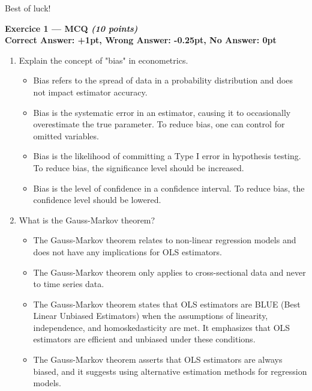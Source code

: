 \documentclass{article}
\begin{document}
\vspace{1cm}

Best of luck!

\newpage

\textbf{Exercice 1 --- MCQ \textit{(10 points)}}\\[1em]
\textbf{Correct Answer: +1pt, Wrong Answer: -0.25pt, No Answer: 0pt}\\[1em]

\begin{enumerate}

\item Explain the concept of "bias" in econometrics.

\begin{itemize}
\item[A.] Bias refers to the spread of data in a probability distribution and does not impact estimator accuracy.
\item[B.] Bias is the systematic error in an estimator, causing it to occasionally overestimate the true parameter. To reduce bias, one can control for omitted variables.
\item[C.] Bias is the likelihood of committing a Type I error in hypothesis testing. To reduce bias, the significance level should be increased.
\item[D.] Bias is the level of confidence in a confidence interval. To reduce bias, the confidence level should be lowered.
\end{itemize}

\item What is the Gauss-Markov theorem?

\begin{itemize}
\item[A.] The Gauss-Markov theorem relates to non-linear regression models and does not have any implications for OLS estimators.
\item[B.] The Gauss-Markov theorem only applies to cross-sectional data and never to time series data.
\item[C.] The Gauss-Markov theorem states that OLS estimators are BLUE (Best Linear Unbiased Estimators) when the assumptions of linearity, independence, and homoskedasticity are met. It emphasizes that OLS estimators are efficient and unbiased under these conditions.
\item[D.] The Gauss-Markov theorem asserts that OLS estimators are always biased, and it suggests using alternative estimation methods for regression models.
\end{itemize}


\end{enumerate}
\end{document}
